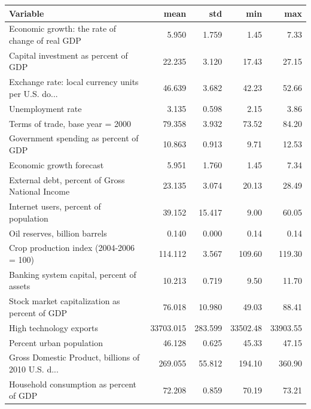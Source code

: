 \documentclass[11pt]{article}
\begin{document}
\begin{table}[H]
\begin{tabular}{lrrrr}
\toprule
{} Variable&        mean &        std &       min &        max \\
\midrule
Economic growth: the rate of change of real GDP    &       5.950 &      1.759 &      1.45 &       7.33 \\
Capital investment as percent of GDP               &      22.235 &      3.120 &     17.43 &      27.15 \\
Exchange rate: local currency units per U.S. do... &      46.639 &      3.682 &     42.23 &      52.66 \\
Unemployment rate                                  &       3.135 &      0.598 &      2.15 &       3.86 \\
Terms of trade, base year = 2000                   &      79.358 &      3.932 &     73.52 &      84.20 \\
Government spending as percent of GDP              &      10.863 &      0.913 &      9.71 &      12.53 \\
Economic growth forecast                           &       5.951 &      1.760 &      1.45 &       7.34 \\
External debt, percent of Gross National Income    &      23.135 &      3.074 &     20.13 &      28.49 \\
Internet users, percent of population              &      39.152 &     15.417 &      9.00 &      60.05 \\
Oil reserves, billion barrels                      &       0.140 &      0.000 &      0.14 &       0.14 \\
Crop production index (2004-2006 = 100)            &     114.112 &      3.567 &    109.60 &     119.30 \\
Banking system capital, percent of assets          &      10.213 &      0.719 &      9.50 &      11.70 \\
Stock market capitalization as percent of GDP      &      76.018 &     10.980 &     49.03 &      88.41 \\
High technology exports                            &   33703.015 &    283.599 &  33502.48 &   33903.55 \\
Percent urban population                           &      46.128 &      0.625 &     45.33 &      47.15 \\
Gross Domestic Product, billions of 2010 U.S. d... &     269.055 &     55.812 &    194.10 &     360.90 \\
Household consumption as percent of GDP            &      72.208 &      0.859 &     70.19 &      73.21 \\

\end{tabular}
\end{table}
\end{document}
